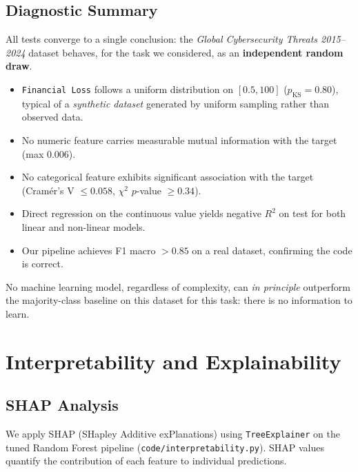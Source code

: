 \documentclass[a4paper,12pt]{article}
\begin{document}
\subsection{Diagnostic Summary}

All tests converge to a single conclusion: the \emph{Global Cybersecurity Threats 2015--2024} dataset behaves, for the task we considered, as an \textbf{independent random draw}.

\begin{itemize}[leftmargin=2cm]
    \item \texttt{Financial Loss} follows a uniform distribution on $[0.5, 100]$ ($p_\text{KS} = 0.80$), typical of a \emph{synthetic dataset} generated by uniform sampling rather than observed data.
    \item No numeric feature carries measurable mutual information with the target (max 0.006).
    \item No categorical feature exhibits significant association with the target (Cram\'er's V $\leq 0.058$, $\chi^2$ $p$-value $\geq 0.34$).
    \item Direct regression on the continuous value yields negative $R^2$ on test for both linear and non-linear models.
    \item Our pipeline achieves F1 macro $> 0.85$ on a real dataset, confirming the code is correct.
\end{itemize}

No machine learning model, regardless of complexity, can \emph{in principle} outperform the majority-class baseline on this dataset for this task: there is no information to learn.

\section{Interpretability and Explainability}
\label{sec:interpretability}

\subsection{SHAP Analysis}

We apply SHAP (SHapley Additive exPlanations) using \texttt{TreeExplainer} on the tuned Random Forest pipeline (\texttt{code/interpretability.py}). SHAP values quantify the contribution of each feature to individual predictions.
\end{document}
